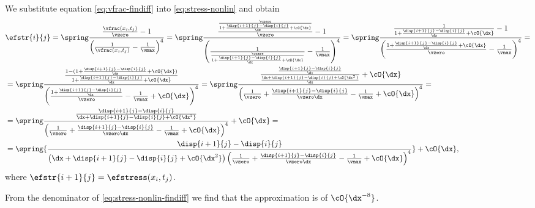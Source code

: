 \documentclass[twoside,a4paper,12pt]{article}
\begin{document}
We substitute equation \eqref{eq:vfrac-findiff} into
\eqref{eq:stress-nonlin} and obtain
%
\begin{align}
  &\efstr{i}{j} = \spring
  \frac{\frac{\vfrac(x_i,t_j)}{\vzero} -1}{\left(\frac{1}{\vfrac(x_i,t_j)} -\frac{1}{\vmax}\right)^4} = \spring
  \frac{\frac{\frac{\vzero}{1+\frac{\disp{i+1}{j} - \disp{i}{j}}{\dx} + \cO{\dx}}}{\vzero} -1}{\left(\frac{1}{\frac{\vzero}{1+\frac{\disp{i+1}{j} - \disp{i}{j}}{\dx} + \cO{\dx}}} -\frac{1}{\vmax}\right)^4} = \spring
  \frac{{\frac{1}{1+\frac{\disp{i+1}{j} - \disp{i}{j}}{\dx} + \cO{\dx}}} -1}{\left({\frac{1+\frac{\disp{i+1}{j} - \disp{i}{j}}{\dx} + \cO{\dx}}{\vzero}} -\frac{1}{\vmax}\right)^4} = \nonumber \\
  &= \spring\frac{\frac{1 -(1+\frac{\disp{i+1}{j} - \disp{i}{j}}{\dx} + \cO{\dx})}{1+\frac{\disp{i+1}{j} - \disp{i}{j}}{\dx} + \cO{\dx}}}{\left({\frac{1+\frac{\disp{i+1}{j} - \disp{i}{j}}{\dx}}{\vzero}} -\frac{1}{\vmax}  + \cO{\dx}\right)^4}
    = \spring\frac{\frac{\frac{\disp{i+1}{j} - \disp{i}{j}}{\dx}}{\frac{\dx + \disp{i+1}{j} - \disp{i}{j} + \cO{\dx^2}}{\dx}} + \cO{\dx}}{\left(\frac{1}{\vzero} + \frac{\disp{i+1}{j} - \disp{i}{j}}{\vzero\dx} -\frac{1}{\vmax}  + \cO{\dx}\right)^4}= \nonumber \\
  &= \spring \frac{\frac{\disp{i+1}{j} - \disp{i}{j}}{\dx + \disp{i+1}{j} - \disp{i}{j} + \cO{\dx^2}}}%
    {\left(\frac{1}{\vzero} + \frac{\disp{i+1}{j} - \disp{i}{j}}{\vzero\dx} -\frac{1}{\vmax}  + \cO{\dx}\right)^4} + \cO{\dx} = \nonumber \\
  &= \spring {\frac{\disp{i+1}{j} - \disp{i}{j}}{\left(\dx + \disp{i+1}{j} - \disp{i}{j} + \cO{\dx^2}\right){\left(\frac{1}{\vzero} + \frac{\disp{i+1}{j} - \disp{i}{j}}{\vzero\dx} -\frac{1}{\vmax}  + \cO{\dx}\right)^4}}}%
    + \cO{\dx} %
  , \label{eq:stress-nonlin-findiff}
\end{align}
where $\efstr{i+1}{j} = \efstress(x_i,t_j)$.

From the denominator of \eqref{eq:stress-nonlin-findiff} we find that
the approximation is of $\cO{\dx^{-8}}$. 
\end{document}
